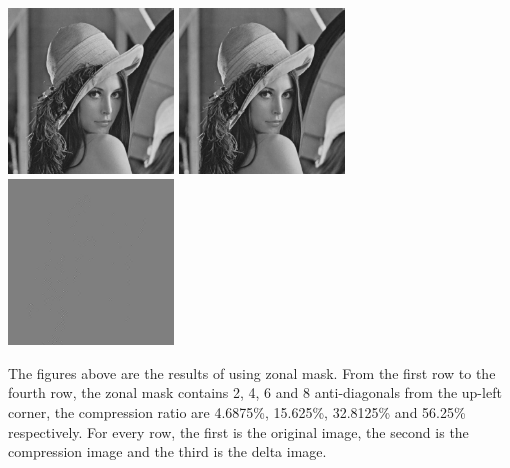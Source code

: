 \documentclass{article}
\begin{document}
\includegraphics[width=0.33\textwidth]{../data/lenna.jpg}
\includegraphics[width=0.33\textwidth]{../data/zonal_7_lenna.jpg}
\includegraphics[width=0.33\textwidth]{../data/delta_zonal_7_lenna.jpg}

The figures above are the results of using zonal mask. From the first row to the fourth row, the zonal mask contains 2, 4, 6 and 8 anti-diagonals from the up-left corner, the compression ratio are 4.6875\%, 15.625\%, 32.8125\% and 56.25\% respectively. For every row, the first is the original image, the second is the compression image and the third is the delta image.
\end{document}
